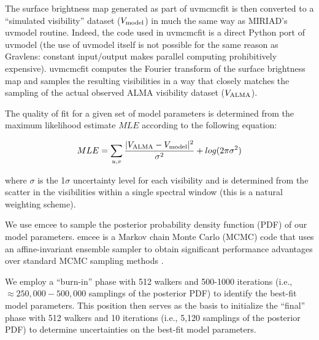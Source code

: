 \documentclass[iop]{emulateapj}
\begin{document}
The surface brightness map generated as part of {\sc uvmcmcfit} is then
converted to a ``simulated visibility'' dataset ($V_{\rm model}$) in much the
same way as MIRIAD's {\sc uvmodel} routine.  Indeed, the code used in {\sc
uvmcmcfit} is a direct Python port of {\sc uvmodel} (the use of {\sc uvmodel}
itself is not possible for the same reason as {\sc Gravlens}: constant
input/output makes parallel computing prohibitively expensive).  {\sc
uvmcmcfit} computes the Fourier transform of the surface brightness map and
samples the resulting visibilities in a way that closely matches the sampling
of the actual observed ALMA visibility dataset ($V_{\rm ALMA}$).

The quality of fit for a given set of model parameters is determined from the
maximum likelihood estimate $MLE$ according to the following equation:

\begin{equation}
    MLE = \sum_{u, v} \frac{|V_{\rm ALMA} - V_{\rm
    model}|^2}{\sigma^2} + log(2 \pi \sigma^2) 
\end{equation}




\noindent where $\sigma$ is the 1$\sigma$ uncertainty level for each
visibility and is determined from the scatter in the visibilities within a
single spectral window (this is a natural weighting scheme).  

We use {\sc emcee} \citep{Foreman-Mackey:2013yq} to sample the posterior
probability density function (PDF) of our model parameters.  {\sc emcee} is a
Markov chain Monte Carlo (MCMC) code that uses an affine-invariant ensemble
sampler to obtain significant performance advantages over standard MCMC
sampling methods \citep{goodmanweare}.  

We employ a ``burn-in'' phase with 512 walkers and 500-1000 iterations (i.e.,
$\approx 250,000-500,000$ samplings of the posterior PDF) to identify the
best-fit model parameters.  This position then serves as the basis to
initialize the ``final'' phase with 512 walkers and 10 iterations (i.e., 5,120
samplings of the posterior PDF) to determine uncertainties on the best-fit
model parameters.  
\end{document}

